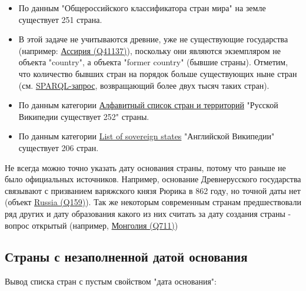 
\begin{itemize}
    \item По данным "Общероссийского классификатора стран мира" на земле существует 251 страна.
    \item В этой задаче не учитываются древние, уже не существующие государства (например: \href{https://www.wikidata.org/wiki/Q41137}{Ассирия (Q41137)}), поскольку они являются экземпляром не объекта "country", а объекта "former country" (бывшие страны). Отметим, что количество бывших стран на порядок больше существующих ныне стран (см. \href{https://query.wikidata.org/#SELECT%20%3Fitem%20%3Flabel%20%3F_image%20WHERE%20%7B%0A%20%20%3Fitem%20wdt%3AP31%20wd%3AQ3024240.%0A%20%20SERVICE%20wikibase%3Alabel%20%7B%0A%20%20%20%20bd%3AserviceParam%20wikibase%3Alanguage%20%22en%22%20.%20%0A%20%20%20%20%3Fitem%20rdfs%3Alabel%20%3Flabel%0A%20%20%7D%0A%20%20%0AOPTIONAL%20%7B%20%3Fitem%20wdt%3AP18%20%3F_image.%20%7D%0A%7D%0A}{SPARQL-запрос}, возвращающий более двух тысяч таких стран).

    \item По данным категории \href{https://ru.wikipedia.org/wiki/%D0%90%D0%BB%D1%84%D0%B0%D0%B2%D0%B8%D1%82%D0%BD%D1%8B%D0%B9_%D1%81%D0%BF%D0%B8%D1%81%D0%BE%D0%BA_%D1%81%D1%82%D1%80%D0%B0%D0%BD_%D0%B8_%D1%82%D0%B5%D1%80%D1%80%D0%B8%D1%82%D0%BE%D1%80%D0%B8%D0%B9}{Алфавитный список стран и территорий} "Русской Википедии существует  252"  страны.

    \item По данным категории \href{https://www.wikipedia.org/wiki/en:List_of_sovereign_states}{List of sovereign states} "Английской Википедии" существует 206 стран.
    \end{itemize}

Не всегда можно точно указать дату основания страны, потому что раньше не было официальных источников. Например, основание Древнерусского государства связывают с призванием варяжского князя Рюрика в 862 году, но точной даты нет (объект \href{https://www.wikidata.org/wiki/Q159} {Russia (Q159)}). Так же некоторым современным странам предшествовали ряд других и дату образования какого из них считать за дату создания страны - вопрос открытый (например, \href{https://www.wikidata.org/wiki/Q711}{Монголия (Q711)})


\subsection{Страны с незаполненной датой основания}

Вывод списка стран с пустым свойством "дата основания":

